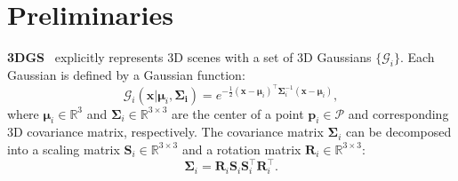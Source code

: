 \documentclass[letterpaper, 10 pt, conference]{ieeeconf}  %
\begin{document}

\section{Preliminaries}
\textbf{3DGS}~\cite{kerbl20233d} explicitly represents 3D scenes with a set of 3D Gaussians $\{\mathcal G_i\}$. Each Gaussian is defined by a Gaussian function:
$$
\mathcal G_i(\bm{x}|\bm{\mu}_i, \bm{\Sigma_i}) = e^{-\frac{1}{2}(\bm{x} - \bm{\mu}_i)^\top\bm{\Sigma}_i^{-1}(\bm{x}-\bm{\mu}_i)},
$$
where $\bm{\mu}_i \in \mathbb R^3$ and $\bm{\Sigma}_i \in \mathbb R^{3\times3}$ are the center of a point $\bm{p}_i\in \mathcal P$ and corresponding 3D covariance matrix, respectively. The covariance matrix $\bm{\Sigma}_i$ can be decomposed into a scaling matrix $\bm{S}_i\in \mathbb R^{3\times3}$ and a rotation matrix $\bm{R}_i\in \mathbb R^{3\times3}$:
$$
\bm{\Sigma}_i = \bm{R}_i\bm{S}_i\bm{S}_i^\top \bm{R}_i^\top.
$$
\end{document}
